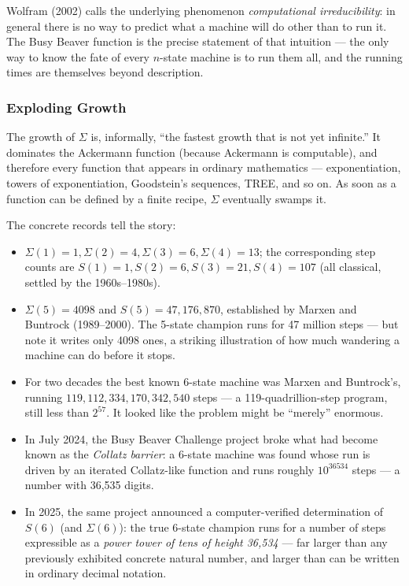 Wolfram (2002) calls the underlying phenomenon \emph{computational irreducibility}: in general there is no way to predict what a machine will do other than to run it. The Busy Beaver function is the precise statement of that intuition --- the only way to know the fate of every $n$-state machine is to run them all, and the running times are themselves beyond description.

\subsubsection*{Exploding Growth}

The growth of $\Sigma$ is, informally, ``the fastest growth that is not yet infinite.'' It dominates the Ackermann function (because Ackermann is computable), and therefore every function that appears in ordinary mathematics --- exponentiation, towers of exponentiation, Goodstein's sequences, TREE, and so on. As soon as a function can be defined by a finite recipe, $\Sigma$ eventually swamps it.

The concrete records tell the story:

\begin{itemize}
\item $\Sigma(1)=1, \Sigma(2)=4, \Sigma(3)=6, \Sigma(4)=13$; the corresponding step counts are $S(1)=1, S(2)=6, S(3)=21, S(4)=107$ (all classical, settled by the 1960s--1980s).
\item $\Sigma(5) = 4098$ and $S(5) = 47,\!176,\!870$, established by Marxen and Buntrock (1989--2000). The 5-state champion runs for 47 million steps --- but note it writes only 4098 ones, a striking illustration of how much wandering a machine can do before it stops.
\item For two decades the best known 6-state machine was Marxen and Buntrock's, running $119,\!112,\!334,\!170,\!342,\!540$ steps --- a 119-quadrillion-step program, still less than $2^{57}$. It looked like the problem might be ``merely'' enormous.
\item In July 2024, the Busy Beaver Challenge project broke what had become known as the \emph{Collatz barrier}: a 6-state machine was found whose run is driven by an iterated Collatz-like function and runs roughly $10^{36534}$ steps --- a number with 36,535 digits.
\item In 2025, the same project announced a computer-verified determination of $S(6)$ (and $\Sigma(6)$): the true 6-state champion runs for a number of steps expressible as a \emph{power tower of tens of height 36,534} --- far larger than any previously exhibited concrete natural number, and larger than can be written in ordinary decimal notation.
\end{itemize}


